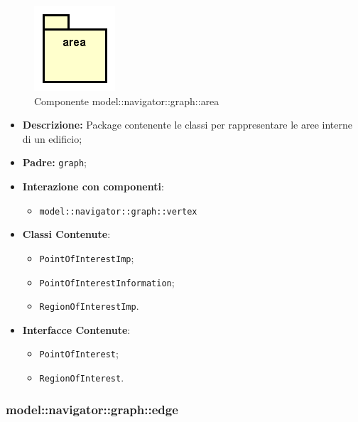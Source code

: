 \documentclass[../DefinizioneDiProdotto.tex]{subfiles}
\begin{document}
\begin{figure}[H]
	\centering
	\includegraphics[width=\maxwidth]{img/package/area.png}
	\caption{Componente model::\-navigator::\-graph::\-area}\label{fig:model::navigator::graph::area} 
\end{figure}
\begin{itemize}
	\item \textbf{Descrizione:} Package contenente le classi per rappresentare le aree interne di un edificio;
	\item \textbf{Padre:} \texttt{graph};
	\item \textbf{Interazione con componenti}:
	\begin{itemize}
		\item \texttt{model::navigator::graph::vertex}
	\end{itemize}
	\item \textbf{Classi Contenute}:
	\begin{itemize}
		\item \texttt{PointOfInterestImp};
		
		\item \texttt{PointOfInterestInformation};
		
		\item \texttt{RegionOfInterestImp}.
		
	\end{itemize}
	\item \textbf{Interfacce Contenute}:
	\begin{itemize}
		\item \texttt{PointOfInterest};
		
		\item \texttt{RegionOfInterest}.
		
	\end{itemize}
\end{itemize}

\subsubsection{model::\-navigator::\-graph::\-edge}
\end{document}
